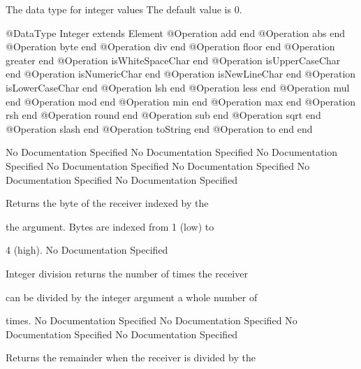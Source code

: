       The data type for integer values The default value is 0.
\begin{Interface}
@DataType Integer extends Element
  @Operation add end
  @Operation abs end
  @Operation byte end
  @Operation div end
  @Operation floor end
  @Operation greater end
  @Operation isWhiteSpaceChar end
  @Operation isUpperCaseChar end
  @Operation isNumericChar end
  @Operation isNewLineChar end
  @Operation isLowerCaseChar end
  @Operation lsh end
  @Operation less end
  @Operation mul end
  @Operation mod end
  @Operation min end
  @Operation max end
  @Operation rsh end
  @Operation round end
  @Operation sub end
  @Operation sqrt end
  @Operation slash end
  @Operation toString end
  @Operation to end
end
\end{Interface}
No Documentation Specified
No Documentation Specified
No Documentation Specified
No Documentation Specified
No Documentation Specified
No Documentation Specified
No Documentation Specified

      Returns the byte of the receiver indexed by the

      the argument. Bytes are indexed from 1 (low) to

      4 (high).
No Documentation Specified

      Integer division returns the number of times the receiver

      can be divided by the integer argument a whole number of

      times.
No Documentation Specified
No Documentation Specified
No Documentation Specified
No Documentation Specified

      Returns the remainder when the receiver is divided by the

